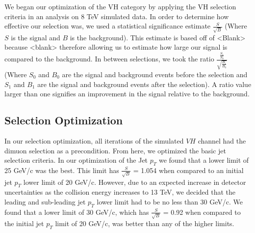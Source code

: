 \documentclass[12pt]{article}
\begin{document}
We began our optimization of the VH category by applying the VH selection criteria in an analysis on 8 TeV simulated data. 
In order to determine how effective our selection was, we used a statistical significance estimate $\frac{S}{\sqrt{B}}$ 
(Where $S$ is the signal and $B$ is the background). 
This estimate is based off of <Blank> because <blank> therefore allowing us to estimate how large our signal is compared to the background. 
In between selections, we took the ratio $\frac{\frac{S_{1}}{S_{0}}}{\sqrt{\frac{B_{1}}{B_{0}}}}$ 
(Where $S_{0}$ and $B_{0}$ are the signal and background events before the selection 
and $S_{1}$ and $B_{1}$ are the signal and background events after the selection). 
A ratio value larger than one signifies an improvement in the signal relative to the background.

\subsection{Selection Optimization}

In our selection optimization, all iterations of the simulated $VH$ channel had the dimuon selection as a precondition. 
From here, we optimized the basic jet selection criteria. In our optimization of the Jet $p_{T}$ we found that a lower limit of 25 GeV/c was the best. 
This limit has $\frac{S}{\sqrt{B}}$ = 1.054 when compared to an initial jet $p_{T}$ lower limit of 20 GeV/c. 
However, due to an expected increase in detector uncertainties as the collision energy increases to 13 TeV, 
we decided that the leading and sub-leading jet $p_{T}$ lower limit had to be no less than 30 GeV/c. 
We found that a lower limit of 30 GeV/c, which has $\frac{S}{\sqrt{B}}$ = 0.92 when compared to the initial jet $p_{T}$ limit of 20 GeV/c, 
was better than any of the higher limits. 
\end{document}
